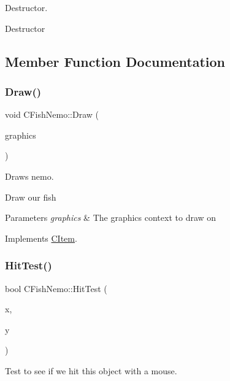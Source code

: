 Destructor. 

Destructor 

\subsection{Member Function Documentation}
\mbox{\label{class_c_fish_nemo_a56389067cff39be91a796f42529458d3}} 
\subsubsection{\texorpdfstring{Draw()}{Draw()}}
{\footnotesize\ttfamily void C\+Fish\+Nemo\+::\+Draw (\begin{DoxyParamCaption}\item[{Gdiplus\+::\+Graphics $\ast$}]{graphics }\end{DoxyParamCaption})\hspace{0.3cm}{\ttfamily [virtual]}}



Draws nemo. 

Draw our fish 
\begin{DoxyParams}{Parameters}
{\em graphics} & The graphics context to draw on \\
\hline
\end{DoxyParams}


Implements \hyperlink{class_c_item_a7ef8448d0c4bc53d0f1943a4dc817f6f}{C\+Item}.

\mbox{\label{class_c_fish_nemo_a7ab85960d0a36a80cd6bf7fb78afe0ee}} 
\subsubsection{\texorpdfstring{Hit\+Test()}{HitTest()}}
{\footnotesize\ttfamily bool C\+Fish\+Nemo\+::\+Hit\+Test (\begin{DoxyParamCaption}\item[{int}]{x,  }\item[{int}]{y }\end{DoxyParamCaption})\hspace{0.3cm}{\ttfamily [virtual]}}



Test to see if we hit this object with a mouse. 

